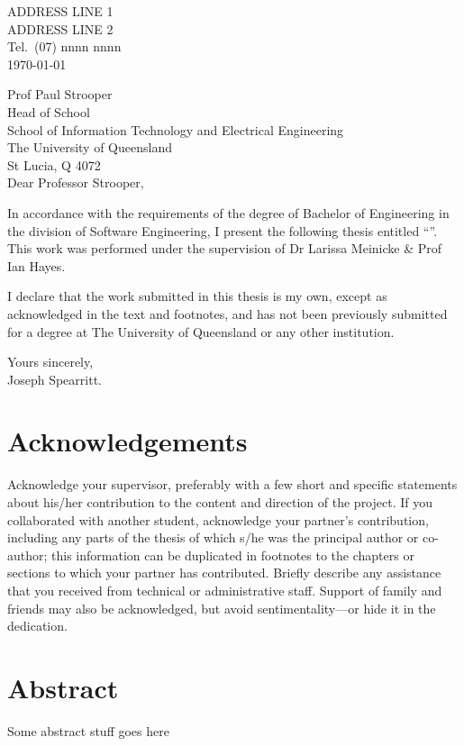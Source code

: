 
\cleardoublepage

\begin{flushright}
	ADDRESS LINE 1\\
	ADDRESS LINE 2\\
	Tel.\ (07) nnnn nnnn\\
	\medskip
	\today
\end{flushright}
\begin{flushleft}
	Prof Paul Strooper\\
	Head of School\\
	School of Information Technology and Electrical Engineering\\
	The University of Queensland\\
	St Lucia, Q 4072\\
	\bigskip\bigskip
	Dear Professor Strooper,
\end{flushleft}

In accordance with the requirements of the degree of Bachelor of Engineering in the division of Software Engineering, I present the following thesis entitled ``\thetitle''. This work was performed under the supervision of Dr Larissa Meinicke \& Prof Ian Hayes.

I declare that the work submitted in this thesis is my own, except as
acknowledged in the text and footnotes, and has not been previously
submitted for a degree at The University of Queensland or any other
institution.

\begin{flushright}
	Yours sincerely,\\
	\medskip
	$ \; $\vspace*{5mm}\\
	\medskip
	Joseph Spearritt.
\end{flushright}

\cleardoublepage

\chapter{Acknowledgements}

Acknowledge your supervisor, preferably with a few short and specific
statements about his/her contribution to the content and direction of
the project.  If you collaborated with another student, acknowledge
your partner's contribution, including any parts of the thesis of
which s/he was the principal author or co-author; this information can
be duplicated in footnotes to the chapters or sections to which your
partner has contributed.  Briefly describe any assistance that you
received from technical or administrative staff.  Support of family
and friends may also be acknowledged, but avoid sentimentality---or
hide it in the dedication.

\chapter{Abstract}

Some abstract stuff goes here